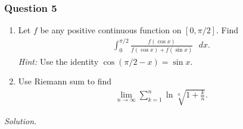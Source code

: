 \documentclass[12pt]{article}
\begin{document}
\subsubsection*{Question 5}
\begin{enumerate}[label=\textbf{(\alph*)}]
    \itemsep 0em
    \item Let $f$ be any positive continuous function on $\left[0,\pi/2\right]$. Find \begin{align*}
        \int_{0}^{\pi/2}\frac{f\left(\operatorname{cos}x\right)}{f\left(\operatorname{cos}x\right)+f\left(\operatorname{sin}x\right)}\text{ }dx.
    \end{align*}
    \textit{Hint:} Use the identity $\operatorname{cos}\left(\pi/2-x\right)=\operatorname{sin}x$.
    \item Use Riemann sum to find \begin{align*}
        \lim_{n\rightarrow\infty}\sum_{k=1}^{n}\operatorname{ln}\sqrt[n]{1+\frac{k}{n}}.
    \end{align*}
\end{enumerate}
\textit{Solution.}
\end{document}
